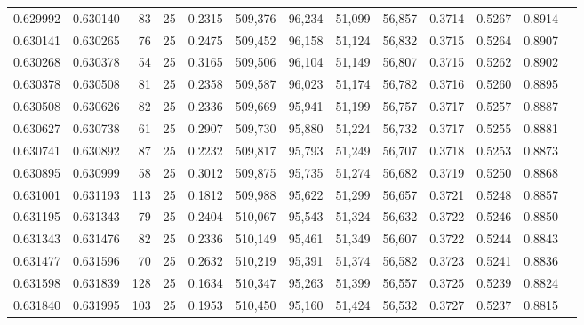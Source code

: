 \begin{tabular}{rrrrrrrrrrrrr}
0.629992 & 0.630140 &    83 &  25 &                                     0.2315 & 509,376 &  96,234 &  51,099 &  56,857 & 0.3714 & 0.5267 & 0.8914 \\
0.630141 & 0.630265 &    76 &  25 &                                     0.2475 & 509,452 &  96,158 &  51,124 &  56,832 & 0.3715 & 0.5264 & 0.8907 \\
0.630268 & 0.630378 &    54 &  25 &                                     0.3165 & 509,506 &  96,104 &  51,149 &  56,807 & 0.3715 & 0.5262 & 0.8902 \\
0.630378 & 0.630508 &    81 &  25 &                                     0.2358 & 509,587 &  96,023 &  51,174 &  56,782 & 0.3716 & 0.5260 & 0.8895 \\
0.630508 & 0.630626 &    82 &  25 &                                     0.2336 & 509,669 &  95,941 &  51,199 &  56,757 & 0.3717 & 0.5257 & 0.8887 \\
0.630627 & 0.630738 &    61 &  25 &                                     0.2907 & 509,730 &  95,880 &  51,224 &  56,732 & 0.3717 & 0.5255 & 0.8881 \\
0.630741 & 0.630892 &    87 &  25 &                                     0.2232 & 509,817 &  95,793 &  51,249 &  56,707 & 0.3718 & 0.5253 & 0.8873 \\
0.630895 & 0.630999 &    58 &  25 &                                     0.3012 & 509,875 &  95,735 &  51,274 &  56,682 & 0.3719 & 0.5250 & 0.8868 \\
0.631001 & 0.631193 &   113 &  25 &                                     0.1812 & 509,988 &  95,622 &  51,299 &  56,657 & 0.3721 & 0.5248 & 0.8857 \\
0.631195 & 0.631343 &    79 &  25 &                                     0.2404 & 510,067 &  95,543 &  51,324 &  56,632 & 0.3722 & 0.5246 & 0.8850 \\
0.631343 & 0.631476 &    82 &  25 &                                     0.2336 & 510,149 &  95,461 &  51,349 &  56,607 & 0.3722 & 0.5244 & 0.8843 \\
0.631477 & 0.631596 &    70 &  25 &                                     0.2632 & 510,219 &  95,391 &  51,374 &  56,582 & 0.3723 & 0.5241 & 0.8836 \\
0.631598 & 0.631839 &   128 &  25 &                                     0.1634 & 510,347 &  95,263 &  51,399 &  56,557 & 0.3725 & 0.5239 & 0.8824 \\
0.631840 & 0.631995 &   103 &  25 &                                     0.1953 & 510,450 &  95,160 &  51,424 &  56,532 & 0.3727 & 0.5237 & 0.8815 \\

\end{tabular}
